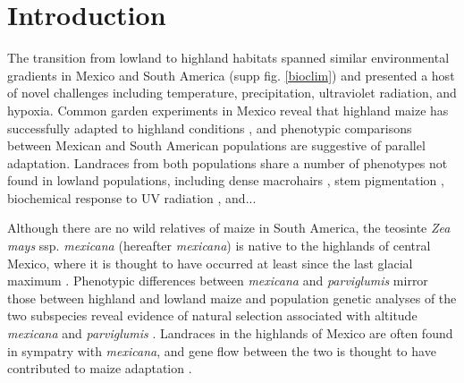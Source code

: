 \section*{Introduction}
%
%
%
%


The transition from lowland to highland habitats spanned similar environmental gradients in Mexico and South America (supp fig. \ref{bioclim}) and presented a host of novel challenges including  temperature, precipitation, ultraviolet radiation, and hypoxia. 
%
%
%
%
%
%
Common garden experiments in Mexico reveal that highland maize has successfully adapted to highland conditions \cite[]{Mercer2008}, and phenotypic comparisons between Mexican and South American populations are suggestive of parallel adaptation.  Landraces from both populations share a number of phenotypes not found in lowland populations, including dense macrohairs \cite[]{CITE}, stem pigmentation \cite[]{CITE}, biochemical response to UV radiation \cite[]{Casati2005}, and...
%
%

Although there are no wild relatives of maize in South America, the teosinte \emph{Zea mays} ssp. \emph{mexicana} (hereafter \emph{mexicana}) is native to the highlands of central Mexico, where it is thought to have occurred at least since the last glacial maximum \cite[]{Ross-Ibarra 2009, Hufford_niche}. Phenotypic differences between \emph{mexicana} and \emph{parviglumis} mirror those between highland and lowland maize \cite[]{Lauter_2004_15342532} and population genetic analyses of the two subspecies reveal evidence of natural selection associated with altitude \emph{mexicana} and \emph{parviglumis} \cite[]{Pyhajarvi2013}.  Landraces in the highlands of Mexico are often found in sympatry with  \emph{mexicana}, and gene flow between the two is thought to have contributed to maize adaptation \cite[]{Profford_2013}.

